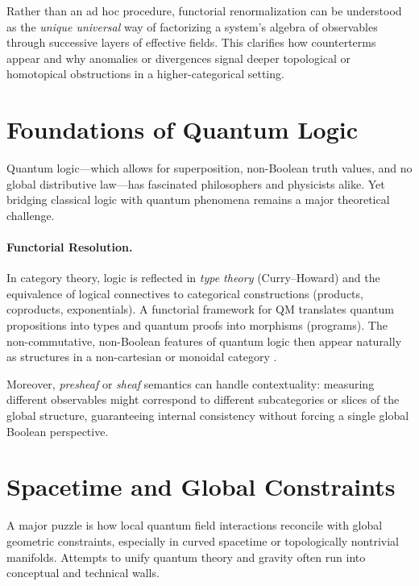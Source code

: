 \documentclass[12pt]{article}
\begin{document}
Rather than an ad hoc procedure, functorial renormalization can be understood as the \emph{unique universal} way of factorizing a system’s algebra of observables through successive layers of effective fields. This clarifies how counterterms appear and why anomalies or divergences signal deeper topological or homotopical obstructions in a higher-categorical setting.

\vspace{1em}

\section{Foundations of Quantum Logic}
Quantum logic---which allows for superposition, non-Boolean truth values, and no global distributive law---has fascinated philosophers and physicists alike. Yet bridging classical logic with quantum phenomena remains a major theoretical challenge.

\paragraph{Functorial Resolution.}
In category theory, logic is reflected in \emph{type theory} (Curry--Howard) and the equivalence of logical connectives to categorical constructions (products, coproducts, exponentials). A functorial framework for QM translates quantum propositions into types and quantum proofs into morphisms (programs). The non-commutative, non-Boolean features of quantum logic then appear naturally as structures in a non-cartesian or monoidal category \cite{AbramskyCoecke, Lambek}. 

Moreover, \emph{presheaf} or \emph{sheaf} semantics can handle contextuality: measuring different observables might correspond to different subcategories or slices of the global structure, guaranteeing internal consistency without forcing a single global Boolean perspective.

\vspace{1em}

\section{Spacetime and Global Constraints}
A major puzzle is how local quantum field interactions reconcile with global geometric constraints, especially in curved spacetime or topologically nontrivial manifolds. Attempts to unify quantum theory and gravity often run into conceptual and technical walls.
\end{document}
